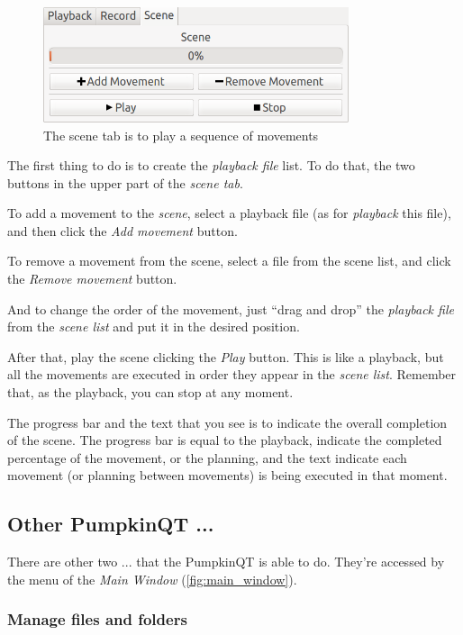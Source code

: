 \documentclass[oneside,a4paper,titlepage]{article}
\begin{document}
	\begin{figure}[h]
		\centering
		\includegraphics[width=0.8\textwidth]{scene_tab}
		\caption[Scene Tab]{The scene tab is to play a sequence of movements}
		\label{fig:scene_tab}
	\end{figure}
	
	The first thing to do is to create the \emph{playback file} list. To do that, the two buttons in the upper part of the \emph{scene tab}.
	
	To add a movement to the \emph{scene}, select a playback file (as for \emph{playback} this file), and then click the \emph{Add movement} button.
	
	To remove a movement from the scene, select a file from the scene list, and click the \emph{Remove movement} button.
	
	And to change the order of the movement, just ``drag and drop'' the \emph{playback file} from the \emph{scene list} and put it in the desired position.
	
	After that, play the scene clicking the \emph{Play} button. This is like a playback, but all the movements are executed in order they appear in the \emph{scene list}. Remember that, as the playback, you can stop at any moment.
	
	The progress bar and the text that you see is to indicate the overall completion of the scene. The progress bar is equal to the playback, indicate the completed percentage of the movement, or the planning, and the text indicate each movement (or planning between movements) is being executed in that moment.
	
\subsection{Other PumpkinQT ...}

There are other two ... that the PumpkinQT is able to do. They're accessed by the menu of the \emph{Main Window} (\ref{fig:main_window}). 

\subsubsection{Manage files and folders}
\end{document}
